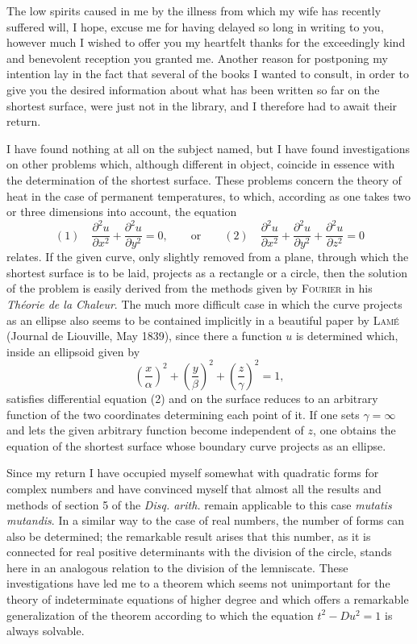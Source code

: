 \documentclass[11pt]{article}
\newcommand{\scn}[1]{\textsc{#1}}
\begin{document}
The low spirits caused in me by the illness from which my wife has recently suffered will, I hope, excuse me for having delayed so long in writing to you, however much I wished to offer you my heartfelt thanks for the exceedingly kind and benevolent reception you granted me. Another reason for postponing my intention lay in the fact that several of the books I wanted to consult, in order to give you the desired information about what has been written so far on the shortest surface, were just not in the library, and I therefore had to await their return.

I have found nothing at all on the subject named, but I have found investigations on other problems which, although different in object, coincide in essence with the determination of the shortest surface. These problems concern the theory of heat in the case of permanent temperatures, to which, according as one takes two or three dimensions into account, the equation
\[
(1)\quad \frac{\partial^2u}{\partial x^2}+\frac{\partial^2u}{\partial y^2}=0,
\qquad\text{or}\qquad
(2)\quad \frac{\partial^2u}{\partial x^2}+\frac{\partial^2u}{\partial y^2}+\frac{\partial^2u}{\partial z^2}=0
\]
relates. If the given curve, only slightly removed from a plane, through which the shortest surface is to be laid, projects as a rectangle or a circle, then the solution of the problem is easily derived from the methods given by \scn{Fourier} in his \emph{Théorie de la Chaleur}. The much more difficult case in which the curve projects as an ellipse also seems to be contained implicitly in a beautiful paper by \scn{Lamé} (Journal de Liouville, May 1839), since there a function $u$ is determined which, inside an ellipsoid given by
\[
 \left(\frac{x}{\alpha}\right)^2+\left(\frac{y}{\beta}\right)^2+\left(\frac{z}{\gamma}\right)^2=1,
\]
satisfies differential equation (2) and on the surface reduces to an arbitrary function of the two coordinates determining each point of it. If one sets $\gamma=\infty$ and lets the given arbitrary function become independent of $z$, one obtains the equation of the shortest surface whose boundary curve projects as an ellipse.

Since my return I have occupied myself somewhat with quadratic forms for complex numbers and have convinced myself that almost all the results and methods of section 5 of the \emph{Disq. arith.} remain applicable to this case \emph{mutatis mutandis}. In a similar way to the case of real numbers, the number of forms can also be determined; the remarkable result arises that this number, as it is connected for real positive determinants with the division of the circle, stands here in an analogous relation to the division of the lemniscate. These investigations have led me to a theorem which seems not unimportant for the theory of indeterminate equations of higher degree and which offers a remarkable generalization of the theorem according to which the equation $t^2-Du^2=1$ is always solvable.
\end{document}
